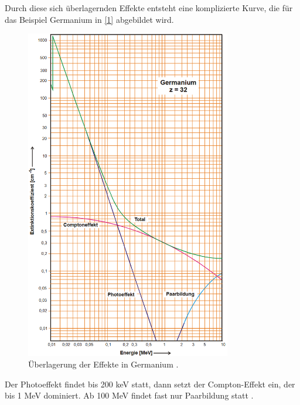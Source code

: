Durch diese sich überlagernden Effekte entsteht eine komplizierte Kurve, die für das Beispiel Germanium in \autoref{1} abgebildet wird. 
\begin{figure}[H]
    \centering
    \includegraphics[width = 9cm]{content/1}
    \caption{Überlagerung der Effekte in Germanium \cite{sample}.}
    \label{1}
  \end{figure}
Der Photoeffekt findet bis 200 keV statt, dann setzt der Compton-Effekt ein, der bis 1 MeV dominiert. Ab 100 MeV findet fast nur Paarbildung statt \cite{sample}. 

